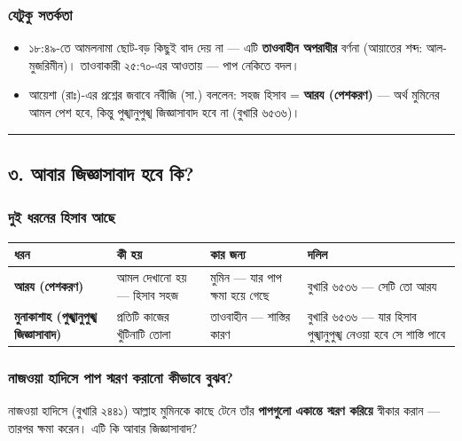 \subsubsection*{যেটুকু সতর্কতা}

\begin{itemize}
\item ১৮:৪৯-তে আমলনামা ছোট-বড় কিছুই বাদ দেয় না — এটি \textbf{তাওবাহীন অপরাধীর} বর্ণনা (আয়াতের শব্দ: আল-মুজরিমীন)। তাওবাকারী ২৫:৭০-এর আওতায় — পাপ নেকিতে বদল।
\item আয়েশা (রাঃ)-এর প্রশ্নের জবাবে নবীজি (সা.) বললেন: সহজ হিসাব = \textbf{আরয (পেশকরণ)} — অর্থ মুমিনের আমল পেশ হবে, কিন্তু পুঙ্খানুপুঙ্খ জিজ্ঞাসাবাদ হবে না (বুখারি ৬৫৩৬)।
\end{itemize}
\medskip\hrule\medskip

\subsection*{৩. আবার জিজ্ঞাসাবাদ হবে কি?}

\subsubsection*{দুই ধরনের হিসাব আছে}

\begin{table}[h]\centering\small
\begin{tabular}{llll}
ধরন & কী হয় & কার জন্য & দলিল \\
\hline
\textbf{আরয (পেশকরণ)} & আমল দেখানো হয় — হিসাব সহজ & মুমিন — যার পাপ ক্ষমা হয়ে গেছে & বুখারি ৬৫৩৬ — \lat{“}সেটি তো আরয\lat{”} \\
\textbf{মুনাকাশাহ (পুঙ্খানুপুঙ্খ জিজ্ঞাসাবাদ)} & প্রতিটি কাজের খুঁটিনাটি তোলা & তাওবাহীন — শাস্তির কারণ & বুখারি ৬৫৩৬ — \lat{“}যার হিসাব পুঙ্খানুপুঙ্খ নেওয়া হবে সে শাস্তি পাবে\lat{”} \\
\hline
\end{tabular}
\end{table}

\subsubsection*{নাজওয়া হাদিসে পাপ স্মরণ করানো কীভাবে বুঝব?}

নাজওয়া হাদিসে (বুখারি ২৪৪১) আল্লাহ মুমিনকে কাছে টেনে তাঁর \textbf{পাপগুলো একান্তে স্মরণ করিয়ে} স্বীকার করান — তারপর ক্ষমা করেন। এটি কি আবার জিজ্ঞাসাবাদ?

